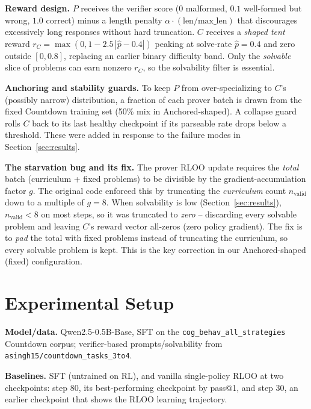\documentclass{article}
\begin{document}
\noindent\textbf{Reward design.} $P$ receives the verifier score
($0$ malformed, $0.1$ well-formed but wrong, $1.0$ correct) minus a length
penalty $\alpha\cdot(\text{len}/\text{max\_len})$ that discourages excessively
long responses without hard truncation. $C$ receives a \emph{shaped tent} reward
$r_C=\max(0,1-2.5\,|\hat{p}-0.4|)$ peaking at solve-rate $\hat{p}=0.4$ and zero
outside $[0,0.8]$, replacing an earlier binary difficulty band. Only the
\emph{solvable} slice of problems can earn nonzero $r_C$, so the solvability
filter is essential.

\noindent\textbf{Anchoring and stability guards.} To keep $P$ from
over-specializing to $C$'s (possibly narrow) distribution, a fraction of each
prover batch is drawn from the fixed Countdown training set (50\% mix in Anchored-shaped). A
collapse guard rolls $C$ back to its last healthy checkpoint if its parseable
rate drops below a threshold. These were added in response to the failure modes
in Section~\ref{sec:results}.

\noindent\textbf{The starvation bug and its fix.}\label{para:starvation} The prover RLOO update requires
the \emph{total} batch (curriculum + fixed problems) to be divisible by the
gradient-accumulation factor $g$. The original code enforced this by truncating
the \emph{curriculum} count $n_{\text{valid}}$ down to a multiple of $g{=}8$.
When solvability is low (Section~\ref{sec:results}), $n_{\text{valid}}<8$ on most
steps, so it was truncated to \emph{zero} -- discarding every solvable problem and
leaving $C$'s reward vector all-zeros (zero policy gradient). The fix is to
\emph{pad} the total with fixed problems instead of truncating the curriculum, so
every solvable problem is kept. This is the key correction in our Anchored-shaped (fixed)
configuration.

\section{Experimental Setup}
\noindent\textbf{Model/data.} Qwen2.5-0.5B-Base, SFT on the
\texttt{cog\_behav\_all\_strategies} Countdown corpus; verifier-based
prompts/solvability from \texttt{asingh15/countdown\_tasks\_3to4}.

\noindent\textbf{Baselines.} SFT (untrained on RL), and vanilla single-policy
RLOO at two checkpoints: step 80, its best-performing checkpoint by pass@1, and
step 30, an earlier checkpoint that shows the RLOO learning trajectory.
\end{document}
